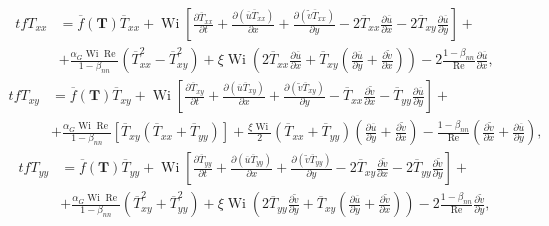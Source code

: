 \begin{equation}
    \begin{aligned}
        tfT_{xx} & = \overline{f}(\mathbf{T})\overline{T}_{xx} + \operatorname{Wi}\left[\frac{\partial \overline{T}_{xx}}{\partial t} + \frac{\partial (\overline{u}\overline{T}_{xx})}{\partial x} + \frac{\partial(\tilde{v}\overline{T}_{xx})}{\partial y} - 2\overline{T}_{xx}\frac{\partial \overline{u}}{\partial x} - 2\overline{T}_{xy}\frac{\partial \overline{u}}{\partial y}\right] + \\ & + \frac{\alpha_{G}\operatorname{Wi}\operatorname{Re}}{1-\beta_{nn}}\left(\overline{T}_{xx}^{2} - \overline{T}_{xy}^{2}\right) + \xi\operatorname{Wi}\left(2\overline{T}_{xx}\frac{\partial \overline{u}}{\partial x} + \overline{T}_{xy}\left(\frac{\partial \overline{u}}{\partial y} + \frac{\partial \tilde{v}}{\partial x}\right)\right) - 2\frac{1-\beta_{nn}}{\operatorname{Re}}\frac{\partial \overline{u}}{\partial x},
    \end{aligned}
    \label{eq_lpog_txx_s_t_2}
\end{equation}
\begin{equation}
    \begin{aligned}
        tfT_{xy} & = \overline{f}(\mathbf{T})\overline{T}_{xy} + \operatorname{Wi}\left[\frac{\partial \overline{T}_{xy}}{\partial t} + \frac{\partial (\overline{u}\overline{T}_{xy})} {\partial x} + \frac{\partial(\tilde{v}\overline{T}_{xy})}{\partial y} - \overline{T}_{xx}\frac{\partial\tilde{v}}{\partial x} - \overline{T}_{yy}\frac{\partial \overline{u}}{\partial y}\right] + \\ & + \frac{\alpha_{G}\operatorname{Wi}\operatorname{Re}}{1-\beta_{nn}}\left[\overline{T}_{xy}\left(\overline{T}_{xx} + \overline{T}_{yy}\right)\right] + \frac{\xi\operatorname{Wi}}{2}\left(\overline{T}_{xx} + \overline{T}_{yy}\right)\left(\frac{\partial \overline{u}}{\partial y} + \frac{\partial \tilde{v}}{\partial x}\right) - \frac{1-\beta_{nn}}{\operatorname{Re}}\left(\frac{\partial \tilde{v}}{\partial x} + \frac{\partial \overline{u}}{\partial y}\right),
    \end{aligned}
    \label{eq_lpog_txy_s_t_2}
\end{equation}
\begin{equation}
    \begin{aligned}
        tfT_{yy} & = \overline{f}(\mathbf{T})\overline{T}_{yy} + \operatorname{Wi}\left[\frac{\partial \overline{T}_{yy}}{\partial t} + \frac{\partial (\overline{u}\overline{T}_{yy})}{\partial x} + \frac{\partial (\tilde{v}\overline{T}_{yy})}{\partial y} - 2\overline{T}_{xy}\frac{\partial \tilde{v}}{\partial x} - 2\overline{T}_{yy}\frac{\partial \tilde{v}}{\partial y}\right] + \\ & + \frac{\alpha_{G}\operatorname{Wi}\operatorname{Re}}{1-\beta_{nn}}\left(\overline{T}_{xy}^{2} + \overline{T}_{yy}^{2}\right) + \xi\operatorname{Wi}\left(2\overline{T}_{yy}\frac{\partial\tilde{v}}{\partial y} + \overline{T}_{xy}\left(\frac{\partial \overline{u}}{\partial y} + \frac{\partial\tilde{v}}{\partial x}\right)\right) - 2\frac{1-\beta_{nn}}{\operatorname{Re}}\frac{\partial\tilde{v}}{\partial y},
    \end{aligned}
    \label{eq_lpog_tyy_s_t_2}
\end{equation}
